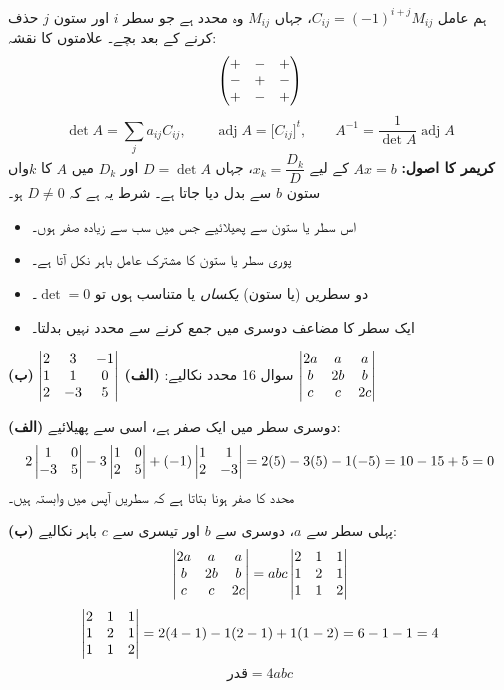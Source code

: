 \begin{nukta}
ہم عامل \(C_{ij}=(-1)^{i+j}M_{ij}\)، جہاں \(M_{ij}\) وہ محدد ہے جو سطر \(i\)
اور ستون \(j\) حذف کرنے کے بعد بچے۔ علامتوں کا نقشہ:
\[
\begin{pmatrix}+&-&+\\-&+&-\\+&-&+\end{pmatrix}
\]
\[
\det A=\sum_j a_{ij}C_{ij},\qquad
\operatorname{adj}A=\bigl[C_{ij}\bigr]^{t},\qquad
A^{-1}=\frac{1}{\det A}\operatorname{adj}A
\]
\textbf{کریمر کا اصول:} \(Ax=b\) کے لیے \(x_k=\dfrac{D_k}{D}\)، جہاں
\(D=\det A\) اور \(D_k\) میں \(A\) کا \(k\)واں ستون \(b\) سے بدل دیا جاتا ہے۔
شرط یہ ہے کہ \(D\neq 0\) ہو۔
\end{nukta}

\begin{nukta}
\begin{itemize}
  \item اس سطر یا ستون سے پھیلائیے جس میں سب سے زیادہ صفر ہوں۔
  \item پوری سطر یا ستون کا مشترک عامل باہر نکل آتا ہے۔
  \item دو سطریں (یا ستون) \emph{یکساں} یا متناسب ہوں تو \(\det=0\)۔
  \item ایک سطر کا مضاعف دوسری میں جمع کرنے سے محدد نہیں بدلتا۔
\end{itemize}
\end{nukta}

\begin{sawal}{سوال \textenglish{16}}
محدد نکالیے: \quad
\textbf{(الف)} \(\begin{vmatrix}2&3&-1\\1&1&0\\2&-3&5\end{vmatrix}\) \qquad
\textbf{(ب)} \(\begin{vmatrix}2a&a&a\\b&2b&b\\c&c&2c\end{vmatrix}\)
\end{sawal}

\begin{hal}
\textbf{(الف)} دوسری سطر میں ایک صفر ہے، اسی سے پھیلائیے:
\[
2\begin{vmatrix}1&0\\-3&5\end{vmatrix}-3\begin{vmatrix}1&0\\2&5\end{vmatrix}+(-1)\begin{vmatrix}1&1\\2&-3\end{vmatrix}
=2(5)-3(5)-1(-5)=10-15+5=0
\]
محدد کا صفر ہونا بتاتا ہے کہ سطریں آپس میں وابستہ ہیں۔

\medskip
\textbf{(ب)} پہلی سطر سے \(a\)، دوسری سے \(b\) اور تیسری سے \(c\) باہر نکالیے:
\[
\begin{vmatrix}2a&a&a\\b&2b&b\\c&c&2c\end{vmatrix}=abc\begin{vmatrix}2&1&1\\1&2&1\\1&1&2\end{vmatrix}
\]
\[
\begin{vmatrix}2&1&1\\1&2&1\\1&1&2\end{vmatrix}=2(4-1)-1(2-1)+1(1-2)=6-1-1=4
\]
\[
\text{قدر}=4abc
\]

\end{hal}

